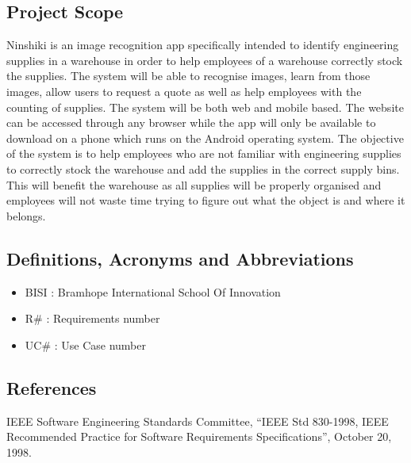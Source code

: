 \documentclass[a4paper, 11pt]{article}
\begin{document}
\subsection{Project Scope}
\begin{flushleft}
Ninshiki is an image recognition app specifically intended to identify engineering supplies in a warehouse in order to help employees of a warehouse correctly stock the supplies. The system will be able to recognise images, learn from those images, allow users to request a quote as well as help employees with the counting of supplies. The system will be both web and mobile based. The website can be accessed through any browser while the app will only be available to download on a phone which runs on the Android operating system. 
\linebreak
\linebreak
The objective of the system is to help employees who are not familiar with engineering supplies to correctly stock the warehouse and add the supplies in the correct supply bins. This will benefit the warehouse as all supplies will be properly organised and employees will not waste time trying to figure out what the object is and where it belongs. 
\end{flushleft}

\subsection{Definitions, Acronyms and Abbreviations}
\begin{itemize}
\item BISI : Bramhope International School Of Innovation
\item R\# : Requirements number
\item UC\# : Use Case number
\end{itemize}

\subsection{References}
IEEE Software Engineering Standards Committee, “IEEE Std 830-1998, IEEE Recommended
Practice for Software Requirements Specifications”, October 20, 1998.

\pagebreak
\end{document}
